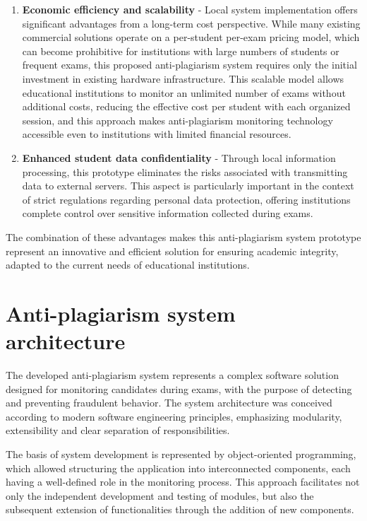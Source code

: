 \documentclass[12pt,a4paper]{article}
\begin{document}
\begin{enumerate}
    \item \textbf{Economic efficiency and scalability} - Local system implementation offers significant advantages from a long-term cost perspective. While many existing commercial solutions operate on a per-student per-exam pricing model, which can become prohibitive for institutions with large numbers of students or frequent exams, this proposed anti-plagiarism system requires only the initial investment in existing hardware infrastructure. This scalable model allows educational institutions to monitor an unlimited number of exams without additional costs, reducing the effective cost per student with each organized session, and this approach makes anti-plagiarism monitoring technology accessible even to institutions with limited financial resources.
    
    \item \textbf{Enhanced student data confidentiality} - Through local information processing, this prototype eliminates the risks associated with transmitting data to external servers. This aspect is particularly important in the context of strict regulations regarding personal data protection, offering institutions complete control over sensitive information collected during exams.
\end{enumerate}

The combination of these advantages makes this anti-plagiarism system prototype represent an innovative and efficient solution for ensuring academic integrity, adapted to the current needs of educational institutions.

\section{Anti-plagiarism system architecture}

The developed anti-plagiarism system represents a complex software solution designed for monitoring candidates during exams, with the purpose of detecting and preventing fraudulent behavior. The system architecture was conceived according to modern software engineering principles, emphasizing modularity, extensibility and clear separation of responsibilities.

The basis of system development is represented by object-oriented programming, which allowed structuring the application into interconnected components, each having a well-defined role in the monitoring process. This approach facilitates not only the independent development and testing of modules, but also the subsequent extension of functionalities through the addition of new components.
\end{document}
